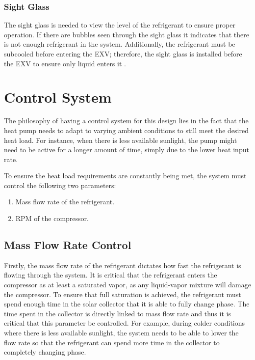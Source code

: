 \subsubsection{Sight Glass}

The sight glass is needed to view the level of the refrigerant to ensure proper operation. If there are bubbles seen through the sight glass it indicates that there is not enough refrigerant in the system. Additionally, the refrigerant must be subcooled before entering the EXV; therefore, the sight glass is installed before the EXV to ensure only liquid enters it \cite{sight_glass_install}.

\section{Control System}

The philosophy of having a control system for this design lies in the fact that the heat pump needs to adapt to varying ambient conditions to still meet the desired heat load. For instance, when there is less available sunlight, the pump might need to be active for a longer amount of time, simply due to the lower heat input rate.

\medskip
To ensure the heat load requirements are constantly being met, the system must control the following two parameters:

\medskip
\begin{enumerate}[itemsep=3mm, parsep=-1mm, label=\roman*.]
	\item Mass flow rate of the refrigerant.
	\item RPM of the compressor.
\end{enumerate}

\subsection{Mass Flow Rate Control}

Firstly, the mass flow rate of the refrigerant dictates how fast the refrigerant is flowing through the system. It is critical that the refrigerant enters the compressor as at least a saturated vapor, as any liquid-vapor mixture will damage the compressor. To ensure that full saturation is achieved, the refrigerant must spend enough time in the solar collector that it is able to fully change phase. The time spent in the collector is directly linked to mass flow rate and thus it is critical that this parameter be controlled. For example, during colder conditions where there is less available sunlight, the system needs to be able to lower the flow rate so that the refrigerant can spend more time in the collector to completely changing phase.

